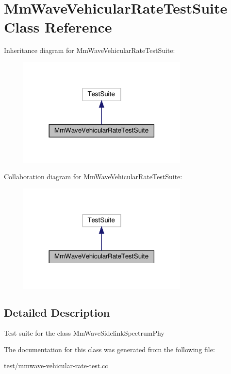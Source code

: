 \hypertarget{classMmWaveVehicularRateTestSuite}{}\section{Mm\+Wave\+Vehicular\+Rate\+Test\+Suite Class Reference}
\label{classMmWaveVehicularRateTestSuite}


Inheritance diagram for Mm\+Wave\+Vehicular\+Rate\+Test\+Suite\+:\nopagebreak
\begin{figure}[H]
\begin{center}
\leavevmode
\includegraphics[width=242pt]{classMmWaveVehicularRateTestSuite__inherit__graph}
\end{center}
\end{figure}


Collaboration diagram for Mm\+Wave\+Vehicular\+Rate\+Test\+Suite\+:\nopagebreak
\begin{figure}[H]
\begin{center}
\leavevmode
\includegraphics[width=242pt]{classMmWaveVehicularRateTestSuite__coll__graph}
\end{center}
\end{figure}


\subsection{Detailed Description}
Test suite for the class Mm\+Wave\+Sidelink\+Spectrum\+Phy 

The documentation for this class was generated from the following file\+:\begin{DoxyCompactItemize}
\item 
test/mmwave-\/vehicular-\/rate-\/test.\+cc\end{DoxyCompactItemize}
